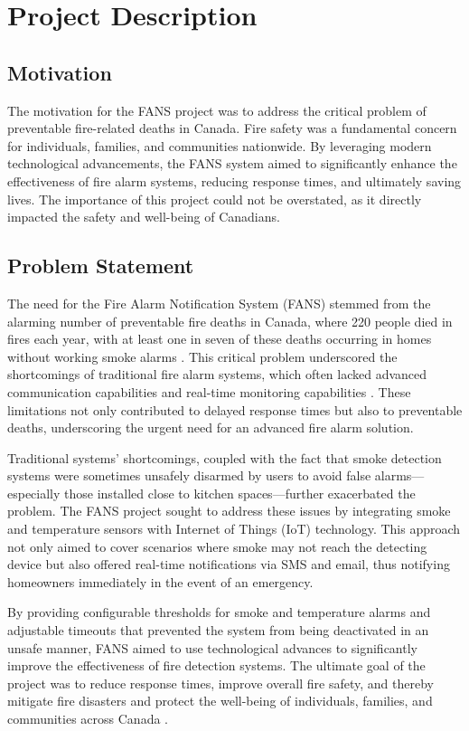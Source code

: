 \section{Project Description}

\subsection{Motivation}

The motivation for the FANS project was to address the critical problem of preventable fire-related deaths in Canada.
Fire safety was a fundamental concern for individuals, families, and communities nationwide. By leveraging modern
technological advancements, the FANS system aimed to significantly enhance the effectiveness of fire alarm systems,
reducing response times, and ultimately saving lives. The importance of this project could not be overstated, as it
directly impacted the safety and well-being of Canadians.

\subsection{Problem Statement}

The need for the Fire Alarm Notification System (FANS) stemmed from the alarming number of preventable fire deaths in
Canada, where 220 people died in fires each year, with at least one in seven of these deaths occurring in homes without
working smoke alarms \cite{fire-stats}. This critical problem underscored the shortcomings of traditional fire alarm
systems, which often lacked advanced communication capabilities and real-time monitoring capabilities
\cite{modern-fire-alarms}. These limitations not only contributed to delayed response times but also to preventable
deaths, underscoring the urgent need for an advanced fire alarm solution.

Traditional systems’ shortcomings, coupled with the fact that smoke detection systems were sometimes unsafely disarmed
by users to avoid false alarms—especially those installed close to kitchen spaces—further exacerbated the problem. The
FANS project sought to address these issues by integrating smoke and temperature sensors with Internet of Things (IoT)
technology. This approach not only aimed to cover scenarios where smoke may not reach the detecting device but also
offered real-time notifications via SMS and email, thus notifying homeowners immediately in the event of an emergency.

By providing configurable thresholds for smoke and temperature alarms and adjustable timeouts that prevented the system
from being deactivated in an unsafe manner, FANS aimed to use technological advances to significantly improve the
effectiveness of fire detection systems. The ultimate goal of the project was to reduce response times, improve overall
fire safety, and thereby mitigate fire disasters and protect the well-being of individuals, families, and communities
across Canada \cite{smoke-alarm-gc}.

